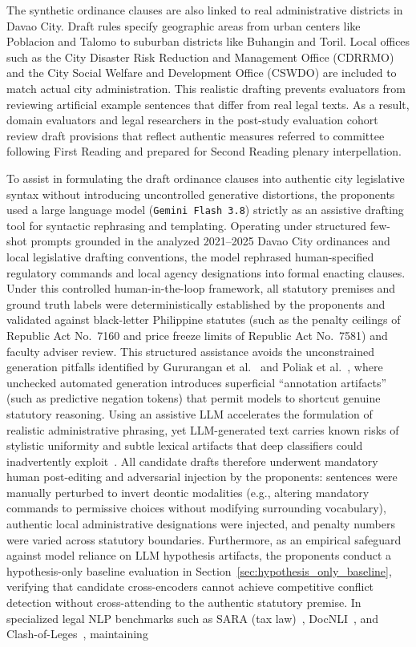     The synthetic ordinance clauses are also linked to real administrative districts in Davao City. Draft rules specify geographic areas from urban centers like Poblacion and Talomo to suburban districts like Buhangin and Toril. Local offices such as the City Disaster Risk Reduction and Management Office (CDRRMO) and the City Social Welfare and Development Office (CSWDO) are included to match actual city administration. This realistic drafting prevents evaluators from reviewing artificial example sentences that differ from real legal texts. As a result, domain evaluators and legal researchers in the post-study evaluation cohort review draft provisions that reflect authentic measures referred to committee following First Reading and prepared for Second Reading plenary interpellation.

    To assist in formulating the draft ordinance clauses into authentic city legislative syntax without introducing uncontrolled generative distortions, the proponents used a large language model (\texttt{Gemini Flash 3.8}) strictly as an assistive drafting tool for syntactic rephrasing and templating. Operating under structured few-shot prompts grounded in the analyzed 2021--2025 Davao City ordinances and local legislative drafting conventions, the model rephrased human-specified regulatory commands and local agency designations into formal enacting clauses. Under this controlled human-in-the-loop framework, all statutory premises and ground truth labels were deterministically established by the proponents and validated against black-letter Philippine statutes (such as the penalty ceilings of Republic Act No.~7160 and price freeze limits of Republic Act No.~7581) and faculty adviser review. This structured assistance avoids the unconstrained generation pitfalls identified by Gururangan et al.~\cite{gururangan2018annotation} and Poliak et al.~\cite{poliak2018hypothesis}, where unchecked automated generation introduces superficial ``annotation artifacts'' (such as predictive negation tokens) that permit models to shortcut genuine statutory reasoning. Using an assistive LLM accelerates the formulation of realistic administrative phrasing, yet LLM-generated text carries known risks of stylistic uniformity and subtle lexical artifacts that deep classifiers could inadvertently exploit~\cite{gururangan2018annotation, poliak2018hypothesis}. All candidate drafts therefore underwent mandatory human post-editing and adversarial injection by the proponents: sentences were manually perturbed to invert deontic modalities (e.g., altering mandatory commands to permissive choices without modifying surrounding vocabulary), authentic local administrative designations were injected, and penalty numbers were varied across statutory boundaries. Furthermore, as an empirical safeguard against model reliance on LLM hypothesis artifacts, the proponents conduct a hypothesis-only baseline evaluation in Section~\ref{sec:hypothesis_only_baseline}, verifying that candidate cross-encoders cannot achieve competitive conflict detection without cross-attending to the authentic statutory premise. In specialized legal NLP benchmarks such as SARA (tax law)~\cite{holzenberger2020a}, DocNLI~\cite{yin2021docnli}, and Clash-of-Leges~\cite{italiani2026clash}, maintaining 